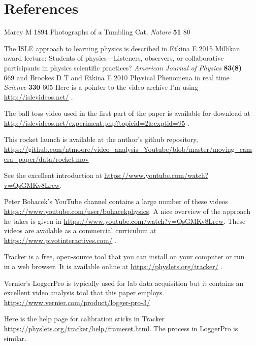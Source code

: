 \documentclass[12pt]{iopart}
\begin{document}

\section*{References}
\begin{thebibliography}{99}

Marey M
1894
Photographs of a Tumbling Cat. 
{\it Nature }
{\bf 51} 
80

The ISLE approach to learning physics is described in 
Etkina E 
2015
Millikan award lecture: Students of physics—Listeners, observers, or collaborative participants in physics scientific practices?
{\it American Journal of Physics}
{\bf 83(8)}
669
and 
Brookes D T and Etkina E
2010
Physical Phenomena in real time
{\it Science}
{\bf 330}
605
Here is a pointer to the video archive I'm using \url{http://islevideos.net/} .
  
The ball toss video used in the first part of the paper is available for download at \url{http://islevideos.net/experiment.php?topicid=2&exptid=95} .

This rocket launch is available at the author's github repository, \url{https://github.com/ntmoore/video_analysis_Youtube/blob/master/moving_camera_paper/data/rocket.mov}

See the excellent introduction at 
\url{https://www.youtube.com/watch?v=QsGMKv8Lrew}. 

 Peter Bohacek's YouTube channel contains a large number of these videos \url{https://www.youtube.com/user/bohacekphysics}.  
A nice overview of the approach he takes is given in \url{https://www.youtube.com/watch?v=QsGMKv8Lrew}. 
These videos are available as a commercial curriculum at \url{https://www.pivotinteractives.com/} .

 Tracker is a free, open-source tool that you can install on your computer or run in a web browser.  It is available online at \url{https://physlets.org/tracker/} .

 Vernier's LoggerPro is typically used for lab data acquisition but it contains an excellent video analysis tool that this paper employs. 
\url{https://www.vernier.com/product/logger-pro-3/}

 Here is the help page for calibration sticks in Tracker \url{https://physlets.org/tracker/help/frameset.html}.  The process in LoggerPro is similar.


\end{thebibliography}
\end{document}
